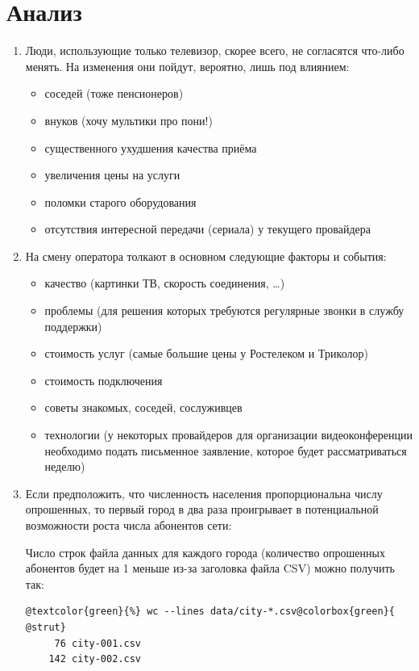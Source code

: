 \documentclass[unicode, 12pt, a4paper,oneside,fleqn]{article}
\begin{document}
\section{Анализ}
\begin{enumerate}
\item Люди, использующие только телевизор, скорее всего, не согласятся
  что-либо менять. На изменения они пойдут, вероятно, лишь под влиянием:
  \begin{itemize}
  \item соседей (тоже пенсионеров)
  \item внуков (хочу мультики про пони!)
  \item существенного ухудшения качества приёма
  \item увеличения цены на услуги
  \item поломки старого оборудования
  \item отсутствия интересной передачи (сериала) у текущего провайдера
  \end{itemize}
\item На смену оператора толкают в основном следующие факторы и события:
  \begin{itemize}
  \item качество (картинки ТВ, скорость соединения, \ldots)
  \item проблемы (для решения которых требуются регулярные звонки в
    службу поддержки)
  \item стоимость услуг (самые большие цены у Ростелеком и Триколор)
  \item стоимость подключения
  \item советы знакомых, соседей, сослуживцев
  \item технологии (у некоторых провайдеров для организации
    видеоконференции необходимо подать письменное заявление, которое
    будет рассматриваться неделю)
  \end{itemize}
\item Если предположить, что численность населения пропорциональна
  числу опрошенных, то первый город в два раза проигрывает в
  потенциальной возможности роста числа абонентов сети:

  Число строк файла данных для каждого города (количество опрошенных
  абонентов будет на 1 меньше из-за заголовка файла CSV) можно
  получить так:
  \begin{Verbatim}[commandchars=@\{\}]
    @textcolor{green}{%} wc --lines data/city-*.csv@colorbox{green}{ @strut}
     76 city-001.csv
    142 city-002.csv
  \end{Verbatim}
\end{enumerate}
\end{document}

